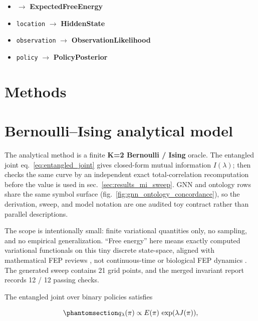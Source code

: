 \documentclass[
  english,
]{article}
\providecommand{\tightlist}{%
  \setlength{\itemsep}{0pt}\setlength{\parskip}{0pt}}
\begin{document}
\begin{itemize}
\tightlist
\item
   \texorpdfstring{\ensuremath{\to}}{->} \textbf{ExpectedFreeEnergy}
\item
  \texttt{location} \texorpdfstring{\ensuremath{\to}}{->} \textbf{HiddenState}
\item
  \texttt{observation} \texorpdfstring{\ensuremath{\to}}{->} \textbf{ObservationLikelihood}
\item
  \texttt{policy} \texorpdfstring{\ensuremath{\to}}{->} \textbf{PolicyPosterior}
\end{itemize}

\newpage

{}
\section*{Methods}

\section{Bernoulli--Ising analytical
model}\label{sec:methods_analytical}

The analytical method is a finite \textbf{K=2 Bernoulli / Ising} oracle.
The entangled joint eq.~\ref{eq:entangled_joint} gives closed-form
mutual information \(I(\lambda)\);
 then checks the same curve by
an independent exact total-correlation recomputation before the value is
used in sec.~\ref{sec:results_mi_sweep}. GNN and ontology rows share the
same symbol surface (fig.~\ref{fig:gnn_ontology_concordance}), so the
derivation, sweep, and model notation are one audited toy contract
rather than parallel descriptions.

The scope is intentionally small: finite variational quantities only, no
sampling, and no empirical generalization. ``Free energy'' here means
exactly computed variational functionals on this tiny discrete
state-space, aligned with mathematical FEP reviews
\citep{buckley2017mathreview}, not continuous-time or biological FEP
dynamics \citep{gershman2019fepbrain}. The generated sweep contains 21
grid points, and the merged invariant report records 12 / 12 passing
checks.

The entangled joint over binary policies satisfies

\begin{equation}\protect\phantomsection\label{eq:entangled_joint}{
q_\lambda(\pi) \propto E(\pi)\,\exp(\lambda J(\pi)),
}\end{equation}
\end{document}
